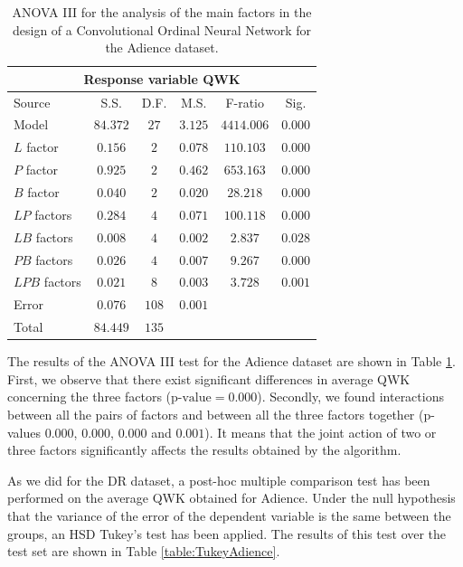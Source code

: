 \documentclass[journal]{IEEEtran}
\begin{document}
	\begin{table}[!t]
		\caption{ANOVA III for the analysis of the main factors in the design of a Convolutional Ordinal Neural Network for the Adience dataset.}
		\label{table:ANOVAAdience}
		\centering
		\small
		\begin{tabular}{lccccc}
			\hline\hline
			            \multicolumn{6}{c}{Response variable QWK}             \\ \hline
			Source        &   S.S.   & D.F.  &  M.S.   &  F-ratio   &  Sig.   \\ \hline
			Model         & $84.372$ & $27$  & $3.125$ & $4414.006$ & $0.000$ \\
			$L$ factor    & $0.156$  &  $2$  & $0.078$ & $110.103$  & $0.000$ \\
			$P$ factor    & $0.925$  &  $2$  & $0.462$ & $653.163$  & $0.000$ \\
			$B$ factor    & $0.040$  &  $2$  & $0.020$ &  $28.218$  & $0.000$ \\
			$LP$ factors  & $0.284$  &  $4$  & $0.071$ & $100.118$  & $0.000$ \\
			$LB$ factors  & $0.008$  &  $4$  & $0.002$ &  $2.837$   & $0.028$ \\
			$PB$ factors  & $0.026$  &  $4$  & $0.007$ &  $9.267$   & $0.000$ \\
			$LPB$ factors & $0.021$  &  $8$  & $0.003$ &  $3.728$   & $0.001$ \\
			Error         & $0.076$  & $108$ & $0.001$ &            &  \\ \hline
			Total         & $84.449$ & $135$ &         &            &  \\ \hline\hline
		\end{tabular}
	\end{table}
	
	The results of the ANOVA III test for the Adience dataset are shown in Table \ref{table:ANOVAAdience}. First, we observe that there exist significant differences in average QWK concerning the three factors ($\text{p-value} = 0.000$). Secondly, we found interactions between all the pairs of factors and between all the three factors together (p-values $0.000$, $0.000$, $0.000$ and $0.001$). It means that the joint action of two or three factors significantly affects the results obtained by the algorithm.
	
	As we did for the DR dataset, a post-hoc multiple comparison test has been performed on the average QWK obtained for Adience. Under the null hypothesis that the variance of the error of the dependent variable is the same between the groups, an HSD Tukey's test has been applied. The results of this test over the test set are shown in Table \ref{table:TukeyAdience}.
	
\end{document}
